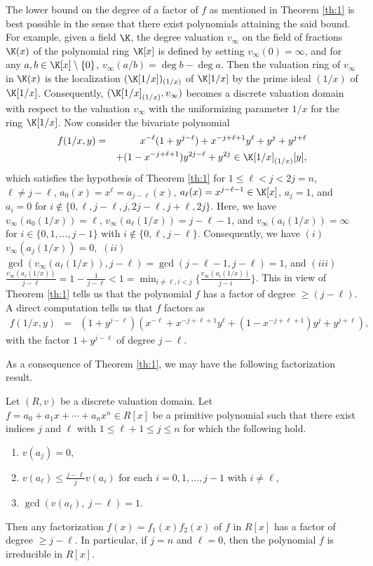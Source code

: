 \documentclass[12pt]{amsart}%
\begin{document}
\begin{remark}
The lower bound on the degree of a factor of $f$ as mentioned in Theorem \ref{th:1} is best possible in the sense that there exist polynomials attaining the said bound. For example, given a field $\K$, the degree valuation $v_\infty$ on the field of fractions $\K(x)$ of the polynomial ring $\K[x]$ is defined by setting $v_\infty(0)=\infty$, and for any $a,b\in \K[x]\setminus\{0\}$, $v_\infty(a/b)=\deg b-\deg a$. Then the valuation ring of $v_\infty$ in $\K(x)$ is the localization $(\K[1/x])_{(1/x)}$ of $\K[1/x]$ by the prime ideal $(1/x)$ of $\K[1/x]$. Consequently, $(\K[1/x]_{(1/x)},v_\infty)$ becomes a discrete valuation domain with respect to the valuation $v_\infty$ with the uniformizing parameter $1/x$ for the ring $\K[1/x]$.  Now consider the bivariate polynomial
\begin{eqnarray*}
f(1/x,y)&=&x^{-\ell}(1+y^{j-\ell})+x^{-j+\ell+1} y^\ell + y^j+y^{j+\ell}\\&&+(1-x^{-j+\ell+1})y^{2j-\ell}+y^{2j}\in \K[1/x]_{(1/x)}[y],
\end{eqnarray*}
which satisfies the hypothesis of Theorem \ref{th:1} for $1\leq \ell<j<2j=n$, $\ell\neq j-\ell$,  $a_0(x)=x^\ell=a_{j-\ell}(x)$,  $a_\ell(x)=x^{j-\ell-1}\in \K[x]$,  $a_j=1$, and $a_i=0$ for $i\not\in \{0,\ell,j-\ell,j, 2j-\ell,j+\ell,2j\}$. Here, we have $v_\infty(a_0(1/x))=\ell$, $v_\infty(a_\ell(1/x))=j-\ell-1$, and $v_\infty(a_i(1/x))=\infty$ for $i\in \{0,1,\ldots, j-1\}$ with $i\not\in\{0,\ell,j-\ell\}$. Consequently, we have $(i)$ $v_\infty(a_j(1/x))=0$,~$(ii)$ $\gcd(v_\infty(a_\ell(1/x)),j-\ell)=\gcd(j-\ell-1,j-\ell)=1$,  and
$(iii)$  $\frac{v_\infty(a_\ell(1/x))}{j-\ell}=1-\frac{1}{j-\ell}<1=\min_{i\neq \ell, i<j}\{\frac{v_\infty(a_i(1/x))}{j-i}\}$.  This in view of Theorem \ref{th:1} tells us that the polynomial $f$ has a factor of degree  $\geq (j-\ell)$. A direct computation tells us that $f$ factors as
\begin{eqnarray*}
f(1/x,y)&=&(1+y^{j-\ell})(x^{-\ell}+x^{-j+\ell+1}y^\ell+(1-x^{-j+\ell+1})y^{j}+y^{j+\ell}),
\end{eqnarray*}
with the factor  $1+y^{j-\ell}$ of degree $j-\ell$.
\end{remark}
As a consequence of Theorem \ref{th:1}, we may have the following factorization result.
\begin{corollary}\label{c:1}
Let $(R,v)$  be a discrete valuation domain. Let $f=a_0 + a_1x + \cdots + a_nx^n \in {R}[x]$ be a primitive polynomial such that there exist indices $j$ and $\ell$ with $1\leq \ell+1 \leq j\leq n$ for which the following hold.
\begin{enumerate}[label=$(\roman*)$]
\item $v(a_j)=0$,
\item $v(a_\ell)\leq \frac{{j-\ell}}{j} v(a_i)$ for each $i=0,1,\ldots, j-1$ with $i\neq \ell$,
\item $\gcd(v(a_\ell),~j-\ell) = 1$.
\end{enumerate}
Then any factorization $f(x)=f_1(x)f_2(x)$ of $f$ in $R[x]$ has a factor of degree $\geq j-\ell$. In particular, if $j=n$ and $\ell=0$, then the polynomial $f$ is irreducible in $R[x]$.
\end{corollary}
\end{document}
